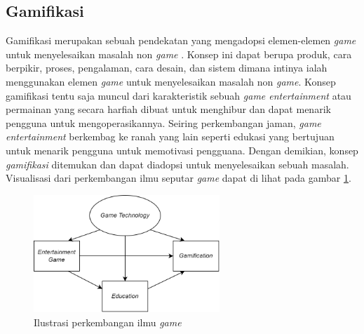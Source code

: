 \subsection{Gamifikasi}
Gamifikasi merupakan sebuah pendekatan yang mengadopsi elemen-elemen \textit{game} untuk menyelesaikan masalah non \textit{game} \cite{marisa2020gamifikasi}.
Konsep ini dapat berupa produk, cara berpikir, proses, pengalaman, cara desain, dan sistem dimana intinya ialah menggunakan elemen \textit{game} untuk menyelesaikan masalah non \textit{game}. 
Konsep gamifikasi tentu saja muncul dari karakteristik sebuah \textit{game entertainment} atau permainan yang secara harfiah dibuat untuk menghibur dan dapat menarik pengguna untuk mengoperasikannya.
Seiring perkembangan jaman, \textit{game entertainment} berkembag ke ranah yang lain seperti edukasi yang bertujuan untuk menarik pengguna untuk memotivasi pengguana.
Dengan demikian, konsep \textit{gamifikasi} ditemukan dan dapat diadopsi untuk menyelesaikan sebuah masalah. Visualisasi dari perkembangan ilmu seputar \textit{game} dapat di lihat pada gambar \ref*{Fig:Ilustrasi perkembangan ilmu game}.
\begin{figure}[H]
	\centering
	\includegraphics[width=7cm]{contents/chapter-2/images/perkembangan-game.png}
	\caption{Ilustrasi perkembangan ilmu \textit{game} \cite{2004activity}}
	\label{Fig:Ilustrasi perkembangan ilmu game}
\end{figure}

